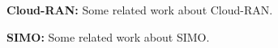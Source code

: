 



\noindent \textbf{Cloud-RAN: } {\color{blue} Some related work about Cloud-RAN.}

\noindent \textbf{SIMO: } {\color{blue} Some related work about SIMO.}